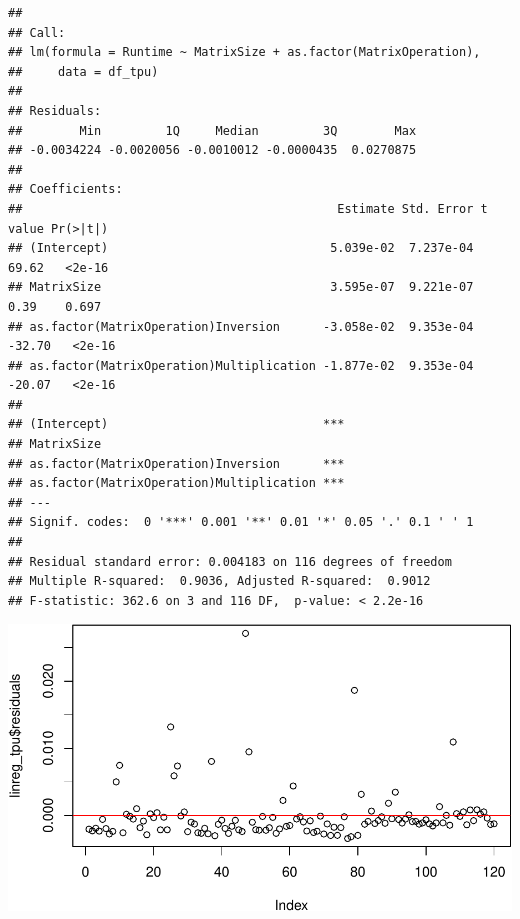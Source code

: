 \documentclass[
]{article}
\newenvironment{Shaded}{\begin{snugshade}}{\end{snugshade}}
\newcommand{\DataTypeTok}[1]{\textcolor[rgb]{0.13,0.29,0.53}{#1}}
\newcommand{\DecValTok}[1]{\textcolor[rgb]{0.00,0.00,0.81}{#1}}
\newcommand{\KeywordTok}[1]{\textcolor[rgb]{0.13,0.29,0.53}{\textbf{#1}}}
\newcommand{\NormalTok}[1]{#1}
\newcommand{\OperatorTok}[1]{\textcolor[rgb]{0.81,0.36,0.00}{\textbf{#1}}}
\newcommand{\StringTok}[1]{\textcolor[rgb]{0.31,0.60,0.02}{#1}}
\begin{document}
\begin{verbatim}
## 
## Call:
## lm(formula = Runtime ~ MatrixSize + as.factor(MatrixOperation), 
##     data = df_tpu)
## 
## Residuals:
##        Min         1Q     Median         3Q        Max 
## -0.0034224 -0.0020056 -0.0010012 -0.0000435  0.0270875 
## 
## Coefficients:
##                                            Estimate Std. Error t value Pr(>|t|)
## (Intercept)                               5.039e-02  7.237e-04   69.62   <2e-16
## MatrixSize                                3.595e-07  9.221e-07    0.39    0.697
## as.factor(MatrixOperation)Inversion      -3.058e-02  9.353e-04  -32.70   <2e-16
## as.factor(MatrixOperation)Multiplication -1.877e-02  9.353e-04  -20.07   <2e-16
##                                             
## (Intercept)                              ***
## MatrixSize                                  
## as.factor(MatrixOperation)Inversion      ***
## as.factor(MatrixOperation)Multiplication ***
## ---
## Signif. codes:  0 '***' 0.001 '**' 0.01 '*' 0.05 '.' 0.1 ' ' 1
## 
## Residual standard error: 0.004183 on 116 degrees of freedom
## Multiple R-squared:  0.9036, Adjusted R-squared:  0.9012 
## F-statistic: 362.6 on 3 and 116 DF,  p-value: < 2.2e-16
\end{verbatim}

\begin{Shaded}
\end{Shaded}

\includegraphics{main_files/figure-latex/unnamed-chunk-13-1.pdf}
\end{document}
